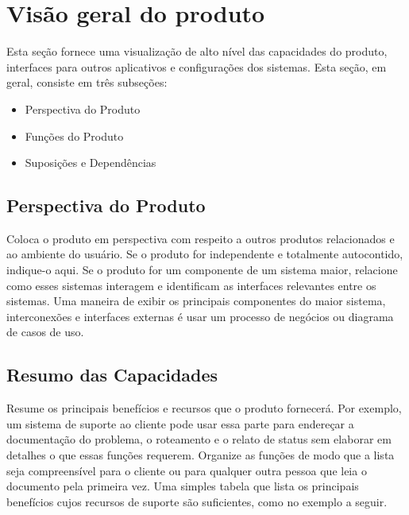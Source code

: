 \documentclass{report}
\begin{document}
\chapter{Visão geral do produto}

Esta seção fornece uma visualização de alto nível das capacidades do produto,
interfaces para outros aplicativos e configurações dos sistemas. Esta seção, em
geral, consiste em três subseções:

\begin{itemize}

	\item
	      Perspectiva do Produto

	\item
	      Funções do Produto

	\item
	      Suposições e Dependências

\end{itemize}

\section{Perspectiva do Produto}

Coloca o produto em perspectiva com respeito a outros produtos relacionados e
ao ambiente do usuário. Se o produto for independente e totalmente autocontido,
indique-o aqui. Se o produto for um componente de um sistema maior, relacione
como esses sistemas interagem e identificam as interfaces relevantes entre os
sistemas. Uma maneira de exibir os principais componentes do maior sistema,
interconexões e interfaces externas é usar um processo de negócios ou diagrama
de casos de uso.

\section{Resumo das Capacidades}

Resume os principais benefícios e recursos que o produto fornecerá. Por
exemplo, um sistema de suporte ao cliente pode usar essa parte para endereçar a
documentação do problema, o roteamento e o relato de status sem elaborar em
detalhes o que essas funções requerem. Organize as funções de modo que a lista
seja compreensível para o cliente ou para qualquer outra pessoa que leia o
documento pela primeira vez. Uma simples tabela que lista os principais
benefícios cujos recursos de suporte são suficientes, como no exemplo a seguir.
\end{document}
